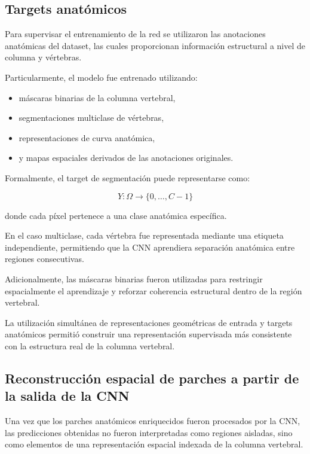 \documentclass[conference]{IEEEtran}
\begin{document}
\subsection{Targets anatómicos}

Para supervisar el entrenamiento de la red se utilizaron las anotaciones anatómicas del dataset, las cuales proporcionan información estructural a nivel de columna y vértebras.

Particularmente, el modelo fue entrenado utilizando:

\begin{itemize}
    \item máscaras binarias de la columna vertebral,
    \item segmentaciones multiclase de vértebras,
    \item representaciones de curva anatómica,
    \item y mapas espaciales derivados de las anotaciones originales.
\end{itemize}

Formalmente, el target de segmentación puede representarse como:

\[
Y:\Omega \rightarrow \{0,\dots,C-1\}
\]

donde cada píxel pertenece a una clase anatómica específica.

En el caso multiclase, cada vértebra fue representada mediante una etiqueta independiente, permitiendo que la CNN aprendiera separación anatómica entre regiones consecutivas.

Adicionalmente, las máscaras binarias fueron utilizadas para restringir espacialmente el aprendizaje y reforzar coherencia estructural dentro de la región vertebral.

La utilización simultánea de representaciones geométricas de entrada y targets anatómicos permitió construir una representación supervisada más consistente con la estructura real de la columna vertebral.





\subsection{Reconstrucción espacial de parches a partir de la salida de la CNN}

Una vez que los parches anatómicos enriquecidos fueron procesados por la CNN, las predicciones obtenidas no fueron interpretadas como regiones aisladas, sino como elementos de una representación espacial indexada de la columna vertebral.
\end{document}
